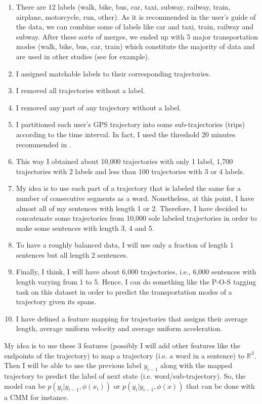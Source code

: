 \documentclass[11pt]{myclass}
\begin{document}
\begin{enumerate}
\item There are 12 labels (walk, bike, bus, car, taxi, subway, railway, train, airplane, motorcycle, run, other). As it is recommended in the user's guide of the data, we can combine some of labels like car and taxi, train, railway and subway. After these sorts of merges, we ended up with 5 major transportation modes (walk, bike, bus, car, train) which constitute the majority of data and are used in other studies (see \cite{DH2018} for example). 

\item  I assigned matchable labels to their corresponding trajectories. 

\item I removed all trajectories without a label.

\item I removed any part of any trajectory without a label.

\item I partitioned each user's GPS trajectory into some sub-trajectories (trips) according to the time interval. In fact, I used the threshold 20 minutes recommended in \cite{ZLWX}. 

\item This way I obtained about 10,000 trajectories with only 1 label, 1,700 trajectories with 2 labels and less than 100 trajectories with 3 or 4 labels. 

\item My idea is to use each part of a trajectory that is labeled the same for a number of consecutive segments as a word. Nonetheless, at this point, I have almost all of my sentences with length 1 or 2. Therefore, I have decided to concatenate some trajectories from 10,000 sole labeled trajectories in order to make some sentences with length 3, 4 and 5. 

\item To have a roughly balanced data, I will use only a fraction of length 1 sentences but all length 2 sentences. 

\item Finally, I think, I will have about 6,000 trajectories, i.e., 6,000 sentences with length varying from 1 to 5. Hence, I can do something like the P-O-S tagging task on this dataset in order to predict the transportation modes of a trajectory given its spans. 

\item I have defined a feature mapping for trajectories that assigns their average length, average uniform velocity and average uniform acceleration. 
\end{enumerate}

My idea is to use these 3 features (possibly I will add other features like the endpoints of the trajectory) to map a trajectory (i.e. a word in a sentence) to $\mathbb{R}^3$. Then I will be able to use the previous label $y_{i-1}$ along with the mapped trajectory to predict the label of next state (i.e. word/sub-trajectory). So, the model can be $p(y_i | y_{i-1}, \phi(x_i))$ or $p(y_i | y_{i-1}, \phi(x))$  that can be done with a CMM for instance. 



\end{document}
